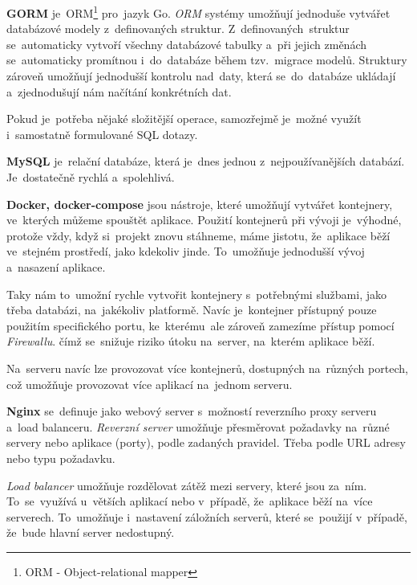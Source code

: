 \documentclass[14pt]{article}
\begin{document}
            \textbf{GORM} je~ORM\footnote{ORM - Object-relational mapper} pro~jazyk Go. \emph{ORM} systémy umožňují jednoduše vytvářet databázové modely z~definovaných struktur. 
            Z~definovaných~struktur se~automaticky vytvoří všechny databázové tabulky a~při jejich změnách se~automaticky promítnou i~do~databáze během tzv.~migrace modelů.
            Struktury zároveň umožňují jednodušší kontrolu nad~daty, která se~do~databáze ukládají a~zjednodušují nám načítání konkrétních dat. \parencite{freecodecamp:orm}

            Pokud je~potřeba nějaké složitější operace, samozřejmě je~možné využít i~samostatně formulované SQL dotazy. \parencite{gormGORM}
            
            \textbf{MySQL} je~relační databáze, která je~dnes jednou z~nejpoužívanějších databází. Je~dostatečně rychlá a~spolehlivá. \parencite{databases21}

            \textbf{Docker, docker-compose} jsou nástroje, které umožňují vytvářet kontejnery, ve~kterých můžeme spouštět aplikace.
            Použití kontejnerů při vývoji je~výhodné, protože vždy, když si~projekt znovu stáhneme, máme jistotu, že~aplikace běží
            ve~stejném prostředí, jako kdekoliv jinde. To~umožňuje jednodušší vývoj a~nasazení aplikace.

            Taky nám to~umožní rychle vytvořit kontejnery s~potřebnými službami, jako třeba databázi, na~jakékoliv platformě. Navíc je~kontejner přístupný pouze použitím specifického portu, ke~kterému~ale zároveň zamezíme přístup pomocí \emph{Firewallu}.
            čímž se~snižuje riziko útoku na~server, na~kterém aplikace běží. \parencite{docker:security}

            Na~serveru navíc lze provozovat více kontejnerů, dostupných na~různých portech, což umožňuje provozovat více aplikací na~jednom serveru.

            \textbf{Nginx} se~definuje jako webový server s~možností reverzního proxy serveru a~load balanceru.
            \emph{Reverzní server} umožňuje přesměrovat požadavky na~různé servery nebo aplikace (porty), podle zadaných pravidel.
            Třeba podle URL adresy nebo typu požadavku.
            
            \emph{Load balancer} umožňuje rozdělovat zátěž mezi servery, které jsou za~ním. To~se~využívá u~větších aplikací nebo v~případě, že~aplikace běží na~více serverech.
            To~umožňuje i~nastavení záložních serverů, které se~použijí v~případě, že~bude hlavní server nedostupný.
            
\end{document}
